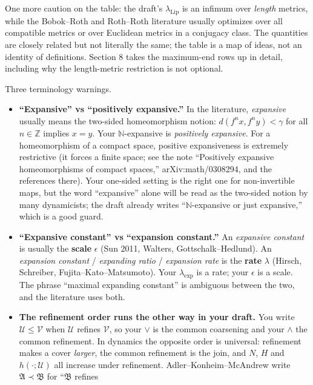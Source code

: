 \documentclass[
]{article}
\begin{document}
One more caution on the table: the draft's \(\lambda_{\mathrm{Lip}}\) is
an infimum over \emph{length} metrics, while the Bobok--Roth and
Roth--Roth literature usually optimizes over all compatible metrics or
over Euclidean metrics in a conjugacy class. The quantities are closely
related but not literally the same; the table is a map of ideas, not an
identity of definitions. Section 8 takes the maximum-end rows up in
detail, including why the length-metric restriction is not optional.

Three terminology warnings.

\begin{itemize}
\item
  \textbf{``Expansive'' vs ``positively expansive.''} In the literature,
  \emph{expansive} usually means the two-sided homeomorphism notion:
  \(d(f^n x,f^n y)<\gamma\) for all \(n\in\mathbb Z\) implies \(x=y\).
  Your \(\mathbb N\)-expansive is \emph{positively expansive}. For a
  homeomorphism of a compact space, positive expansiveness is extremely
  restrictive (it forces a finite space; see the note ``Positively
  expansive homeomorphisms of compact spaces,'' arXiv:math/0308294, and
  the references there). Your one-sided setting is the right one for
  non-invertible maps, but the word ``expansive'' alone will be read as
  the two-sided notion by many dynamicists; the draft already writes
  ``\(\mathbb N\)-expansive or just expansive,'' which is a good guard.
\item
  \textbf{``Expansive constant'' vs ``expansion constant.''} An
  \emph{expansive constant} is usually the \textbf{scale} \(\epsilon\)
  (Sun 2011, Walters, Gottschalk--Hedlund). An \emph{expansion constant}
  / \emph{expanding ratio} / \emph{expansion rate} is the \textbf{rate}
  \(\lambda\) (Hirsch, Schreiber, Fujita--Kato--Matsumoto). Your
  \(\lambda_{\exp}\) is a rate; your \(\epsilon\) is a scale. The phrase
  ``maximal expanding constant'' is ambiguous between the two, and the
  literature uses both.
\item
  \textbf{The refinement order runs the other way in your draft.} You
  write \(\mathcal U\le\mathcal V\) when \(\mathcal U\) refines
  \(\mathcal V\), so your \(\vee\) is the common coarsening and your
  \(\wedge\) the common refinement. In dynamics the opposite order is
  universal: refinement makes a cover \emph{larger}, the common
  refinement is the join, and \(N\), \(H\) and \(h(\cdot;\mathcal U)\)
  all increase under refinement. Adler--Konheim--McAndrew write
  \(\mathfrak{A}\prec\mathfrak{B}\) for ``\(\mathfrak{B}\) refines

\end{itemize}
\end{document}
